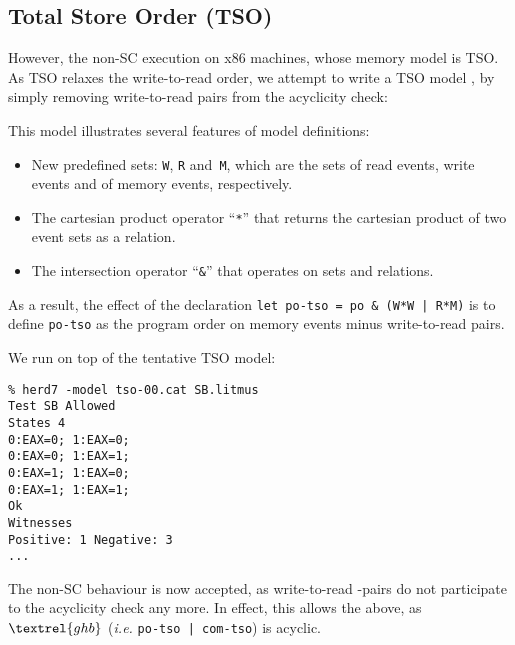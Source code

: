 \subsection{Total Store Order (TSO)}
However, the non-SC execution  on x86 machines,
whose memory model is TSO. As TSO relaxes the write-to-read order, we attempt
to write a TSO model , by simply removing write-to-read
pairs from the acyclicity check:

This model illustrates several features
of model definitions:
\begin{itemize}
\item New predefined sets: \verb+W+, \verb+R+ and~\verb+M+, which are
the sets of read events, write events and of memory events, respectively.
\item The cartesian product operator ``\verb+*+'' that returns the cartesian
product of two event sets as a relation.
\item The intersection operator ``\verb+&+'' that operates on sets and
relations.
\end{itemize}
As a result, the effect of the declaration
\verb+let po-tso = po & (W*W | R*M)+ is to define \verb+po-tso+
as the program order on memory events minus write-to-read pairs.

We run  on top of the tentative TSO model:
\begin{verbatim}
% herd7 -model tso-00.cat SB.litmus
Test SB Allowed
States 4
0:EAX=0; 1:EAX=0;
0:EAX=0; 1:EAX=1;
0:EAX=1; 1:EAX=0;
0:EAX=1; 1:EAX=1;
Ok
Witnesses
Positive: 1 Negative: 3
...
\end{verbatim}
\label{sb:image}The non-SC behaviour is now accepted, as write-to-read -pairs
do not participate to the acyclicity check any more. In effect, this allows
the  above,
as $\textrel{ghb}$ (\emph{i.e.}
\verb+po-tso | com-tso+) is acyclic.
\begin{center}\end{center}


